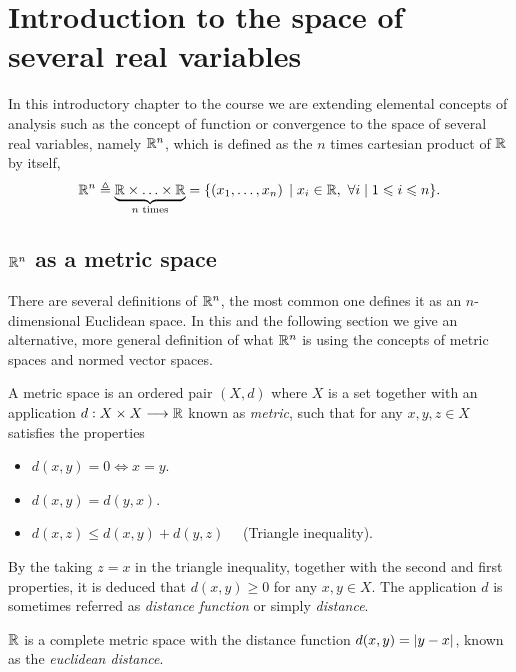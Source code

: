 \chapter[Introduction to the space of several real variables]{Introduction to the space of \\ several real variables}
\thispagestyle{noheaders}

In this introductory chapter to the course we are extending elemental concepts of analysis such as the concept of function or 
convergence to the space of several real variables, namely $\Rtn$, which is defined as the $n$ times cartesian product of $\R$ 
by itself,
\begin{equation}
\Rtn\bydef\underbrace{\R\times\ldots\times\R}_{n\textrm{ times}} = \{\left(x_1, \ldots, x_n\right)\st x_i\in\R,\ \forall i\st
1 \leq i \leq n\}.
\end{equation}

\section{$\Rtn$ as a metric space}

There are several definitions of $\Rtn$, the most common one defines it as an $n$-dimensional Euclidean space. In this 
and the following section we give an alternative, more general definition of what $\Rtn$ is using the concepts of metric 
spaces and normed vector spaces.

\begin{defn}\label{def:metric-space}
A metric space is an ordered pair $\left(X, d\right)$ where $X$ is a set together with an application 
$\appl{d}{X\times X}{\R}$ known as \textit{metric}, such that for any $x, y, z\in X$ satisfies the properties
\begin{itemize}[itemsep = -2pt]
	\item $d(x, y) = 0\iff x = y$.
	\item $d(x, y) = d(y, x)$.
	\item $d(x, z) \leq d(x, y) + d(y, z)\quad$ (Triangle inequality).
\end{itemize}
\end{defn}

By the taking $z = x$ in the triangle inequality, together with the second and first properties, it is deduced that $d(x, y)\geq 0$
for any $x, y\in X$. The application $d$ is sometimes referred as \textit{distance function} or simply \textit{distance}.

\begin{example}
	$\R$ is a complete metric space with the distance function $d(x, y) = \abs{y - x}$, known as the \textit{euclidean distance}.
\end{example}

